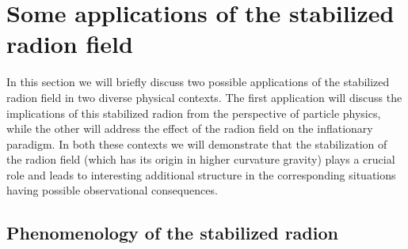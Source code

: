 \documentclass{article}
\begin{document}
\section{Some applications of the stabilized radion field}

In this section we will briefly discuss two possible applications of the stabilized radion field in two diverse physical contexts. The first application will discuss the implications of this stabilized radion from the perspective of particle physics, while the other will address the effect of the radion field on the inflationary paradigm. In both these contexts we will demonstrate that the stabilization of the radion field (which has its origin in higher curvature gravity) plays a crucial role and leads to interesting additional structure in the corresponding situations having possible observational consequences.
\subsection{Phenomenology of the stabilized radion}
\end{document}

